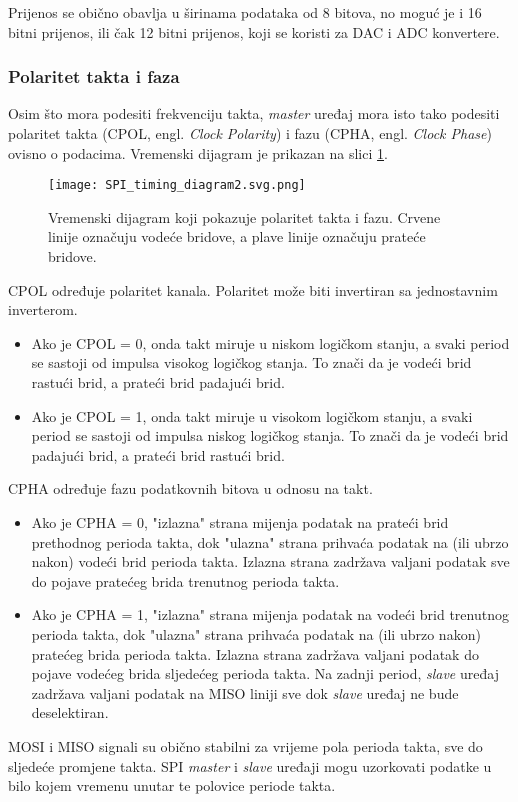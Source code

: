 Prijenos se obično obavlja u širinama podataka od 8 bitova, no moguć je i 16 bitni prijenos, ili čak 12 bitni prijenos, koji se koristi za DAC i ADC konvertere.

\subsubsection{Polaritet takta i faza}

Osim što mora podesiti frekvenciju takta, \textit{master} uređaj mora isto tako podesiti polaritet takta (CPOL, engl. \textit{Clock Polarity}) i fazu (CPHA, engl. \textit{Clock Phase}) ovisno o podacima. Vremenski dijagram je prikazan na slici \ref{fig:spi_timing_diagram}.
\begin{figure}[H]
	\centering
	\texttt{[image: SPI\_timing\_diagram2.svg.png]}
	\caption{Vremenski dijagram koji pokazuje polaritet takta i fazu. Crvene linije označuju vodeće bridove, a plave linije označuju prateće bridove.}
	\label{fig:spi_timing_diagram}
\end{figure}
CPOL određuje polaritet kanala. Polaritet može biti invertiran sa jednostavnim inverterom.
\begin{itemize}
	\item Ako je CPOL = 0, onda takt miruje u niskom logičkom stanju, a svaki period se sastoji od impulsa visokog logičkog stanja. To znači da je vodeći brid rastući brid, a prateći brid padajući brid.
	\item Ako je CPOL = 1, onda takt miruje u visokom logičkom stanju, a svaki period se sastoji od impulsa niskog logičkog stanja. To znači da je vodeći brid padajući brid, a prateći brid rastući brid.
\end{itemize}
CPHA određuje fazu podatkovnih bitova u odnosu na takt.
\begin{itemize}
	\item Ako je CPHA = 0, "izlazna" strana mijenja podatak na prateći brid prethodnog perioda takta, dok "ulazna" strana prihvaća podatak na (ili ubrzo nakon) vodeći brid perioda takta. Izlazna strana zadržava valjani podatak sve do pojave pratećeg brida trenutnog perioda takta.
	\item Ako je CPHA = 1, "izlazna" strana mijenja podatak na vodeći brid trenutnog perioda takta, dok "ulazna" strana prihvaća podatak na (ili ubrzo nakon) pratećeg brida perioda takta. Izlazna strana zadržava valjani podatak do pojave vodećeg brida sljedećeg perioda takta. Na zadnji period, \textit{slave} uređaj zadržava valjani podatak na MISO liniji sve dok \textit{slave} uređaj ne bude deselektiran.
\end{itemize}
MOSI i MISO signali su obično stabilni za vrijeme pola perioda takta, sve do sljedeće promjene takta. SPI \textit{master} i \textit{slave} uređaji mogu uzorkovati podatke u bilo kojem vremenu unutar te polovice periode takta.


